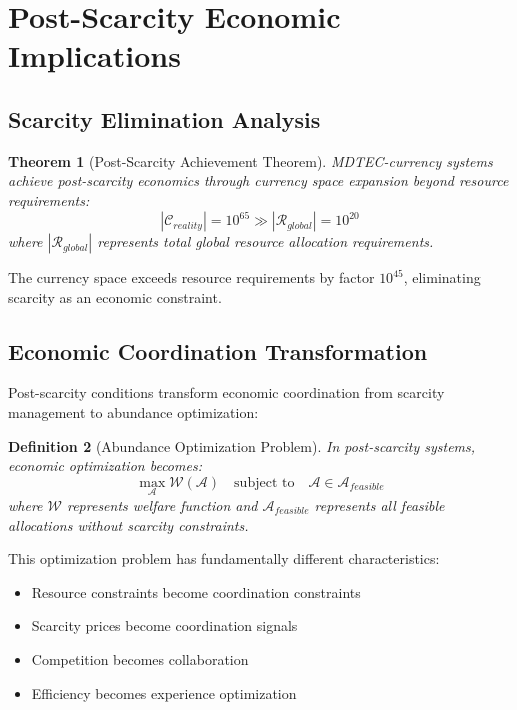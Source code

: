 \documentclass[12pt,a4paper]{article}
\newtheorem{theorem}{Theorem}
\newtheorem{definition}[theorem]{Definition}
\begin{document}
\section{Post-Scarcity Economic Implications}

\subsection{Scarcity Elimination Analysis}

\begin{theorem}[Post-Scarcity Achievement Theorem]
MDTEC-currency systems achieve post-scarcity economics through currency space expansion beyond resource requirements:
\begin{equation}
|\mathcal{C}_{reality}| = 10^{65} \gg |\mathcal{R}_{global}| = 10^{20}
\end{equation}
where $|\mathcal{R}_{global}|$ represents total global resource allocation requirements.
\end{theorem}

The currency space exceeds resource requirements by factor $10^{45}$, eliminating scarcity as an economic constraint.

\subsection{Economic Coordination Transformation}

Post-scarcity conditions transform economic coordination from scarcity management to abundance optimization:

\begin{definition}[Abundance Optimization Problem]
In post-scarcity systems, economic optimization becomes:
\begin{equation}
\max_{\mathcal{A}} \mathcal{W}(\mathcal{A}) \quad \text{subject to} \quad \mathcal{A} \in \mathcal{A}_{feasible}
\end{equation}
where $\mathcal{W}$ represents welfare function and $\mathcal{A}_{feasible}$ represents all feasible allocations without scarcity constraints.
\end{definition}

This optimization problem has fundamentally different characteristics:
\begin{itemize}
\item Resource constraints become coordination constraints
\item Scarcity prices become coordination signals  
\item Competition becomes collaboration
\item Efficiency becomes experience optimization
\end{itemize}
\end{document}
